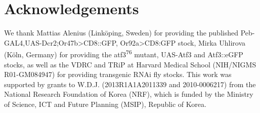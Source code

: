 \section*{Acknowledgements}

We thank Mattias Alenius (Link{\"{o}}ping, Sweden) for providing the published Peb-GAL4,UAS-Dcr2;Or47b\textgreater{}CD8::GFP, Or92a\textgreater{}CD8:GFP stock, Mirka Uhlirova (K{\"{o}}ln, Germany) for providing the atf3\textsuperscript{76} mutant, UAS-Atf3 and Atf3::eGFP stocks, as well as the VDRC and TRiP at Harvard Medical School (NIH/NIGMS R01-GM084947) for providing transgenic RNAi fly stocks.
This work was supported by grants to W.D.J. (2013R1A1A2011339 and 2010-0006217) from the National Research Foundation of Korea (NRF), which is funded by the Ministry of Science, ICT and Future Planning (MSIP), Republic of Korea.